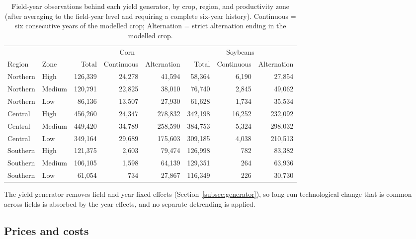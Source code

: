 \documentclass[11pt,letterpaper]{article}
\theoremstyle{remark}
\begin{document}
\begin{table}[htbp]
\centering
\caption{Field-year observations behind each yield generator, by crop, region, and productivity zone (after averaging to the field-year level and requiring a complete six-year history). Continuous = six consecutive years of the modelled crop; Alternation = strict alternation ending in the modelled crop.}
\label{tab:sample_sizes}
\small
\begin{tabular}{llrrrrrr}
\hline
 & & \multicolumn{3}{c}{Corn} & \multicolumn{3}{c}{Soybeans} \\
Region & Zone & Total & Continuous & Alternation & Total & Continuous & Alternation \\
\hline
Northern & High   & 126,339 & 24,278 & 41,594  & 58,364  & 6,190  & 27,854 \\
Northern & Medium & 120,791 & 22,825 & 38,010  & 76,740  & 2,845  & 49,062 \\
Northern & Low    & 86,136  & 13,507 & 27,930  & 61,628  & 1,734  & 35,534 \\
Central  & High   & 456,260 & 24,347 & 278,832 & 342,198 & 16,252 & 232,092 \\
Central  & Medium & 449,420 & 34,789 & 258,590 & 384,753 & 5,324  & 298,032 \\
Central  & Low    & 349,164 & 29,689 & 175,603 & 309,185 & 4,038  & 210,513 \\
Southern & High   & 121,375 & 2,603  & 79,474  & 126,998 & 782    & 83,382 \\
Southern & Medium & 106,105 & 1,598  & 64,139  & 129,351 & 264    & 63,936 \\
Southern & Low    & 61,054  & 734    & 27,867  & 116,349 & 226    & 30,730 \\
\hline
\end{tabular}
\end{table}
 
The yield generator removes field and year fixed effects (Section~\ref{subsec:generator}), so long-run technological change that is common across fields is absorbed by the year effects, and no separate detrending is applied.
 
\subsection{\label{subsec:prices_costs}Prices and costs}
 
\end{document}
